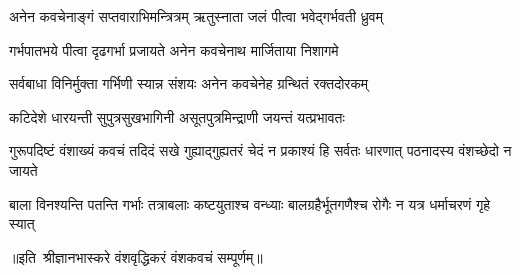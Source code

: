 \twolineshloka
{अनेन कवचेनाङ्गं सप्तवाराभिमन्त्रित्रम्}
{ऋतुस्नाता जलं पीत्वा भवेद्गर्भवती ध्रुवम्}%

\twolineshloka
{गर्भपातभये पीत्वा दृढगर्भा प्रजायते}
{अनेन कवचेनाथ मार्जिताया निशागमे}%

\twolineshloka
{सर्वबाधा विनिर्मुक्ता गर्भिणी स्यान्न संशयः}
{अनेन कवचेनेह ग्रन्थितं रक्तदोरकम्}%

\twolineshloka
{कटिदेशे धारयन्ती सुपुत्रसुखभागिनी}
{असूतपुत्रमिन्द्राणी जयन्तं यत्प्रभावतः}%

\threelineshloka
{गुरूपदिष्टं वंशाख्यं कवचं तदिदं सखे}
{गुह्याद्गुह्यतरं चेदं न प्रकाश्यं हि सर्वतः}
{धारणात् पठनादस्य वंशच्छेदो न जायते}%

\fourlineindentedshloka
{बाला विनश्यन्ति पतन्ति गर्भाः}
{तत्राबलाः कष्टयुताश्च वन्ध्याः}
{बालग्रहैर्भूतगणैश्च रोगैः}
{न यत्र धर्माचरणं गृहे स्यात्}

{॥इति~श्रीज्ञानभास्करे वंशवृद्धिकरं वंशकवचं सम्पूर्णम्॥}